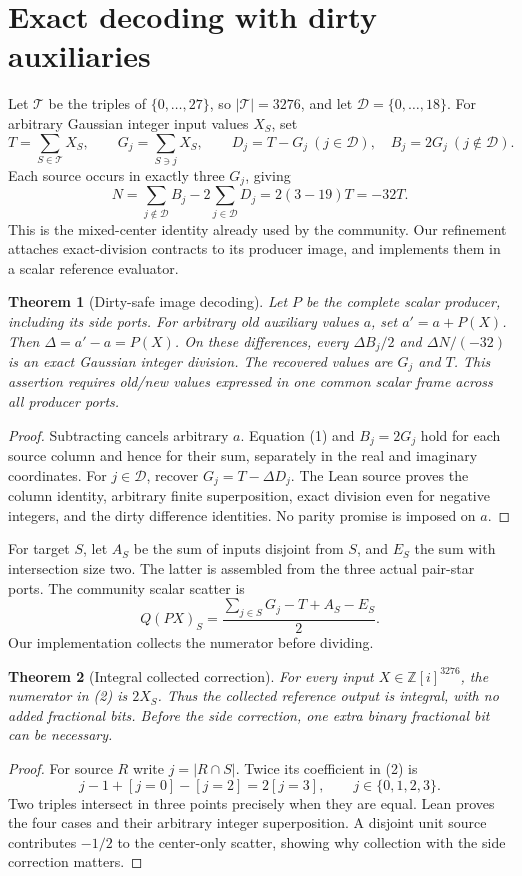 \documentclass[11pt,a4paper]{article}
\newtheorem{theorem}{Theorem}
\newcommand{\Gi}{\mathbb Z[i]}
\begin{document}
\section{Exact decoding with dirty auxiliaries}
Let $\mathcal T$ be the triples of $\{0,\ldots,27\}$, so
$|\mathcal T|=3276$, and let $\mathcal D=\{0,\ldots,18\}$.
For arbitrary Gaussian integer input values $X_S$, set
\[
 T=\sum_{S\in\mathcal T}X_S,\qquad
 G_j=\sum_{S\ni j}X_S,\qquad
 D_j=T-G_j\ (j\in\mathcal D),\quad
 B_j=2G_j\ (j\notin\mathcal D).
\]
Each source occurs in exactly three $G_j$, giving
\[
 N=\sum_{j\notin\mathcal D}B_j-2\sum_{j\in\mathcal D}D_j
   =2(3-19)T=-32T.\tag{1}
\]
This is the mixed-center identity already used by the community. Our
refinement attaches exact-division contracts to its producer image, and
implements them in a scalar reference evaluator.

\begin{theorem}[Dirty-safe image decoding]
Let $P$ be the complete scalar producer, including its side ports.
For arbitrary old auxiliary values $a$, set $a'=a+P(X)$.
Then $\Delta=a'-a=P(X)$. On these differences, every
$\Delta B_j/2$ and $\Delta N/(-32)$ is an exact Gaussian integer division.
The recovered values are $G_j$ and $T$. This assertion requires old/new
values expressed in one common scalar frame across all producer ports.
\end{theorem}
\begin{proof}
Subtracting cancels arbitrary $a$. Equation (1) and $B_j=2G_j$ hold for
each source column and hence for their sum, separately in the real and
imaginary coordinates. For $j\in\mathcal D$, recover
$G_j=T-\Delta D_j$. The Lean source proves the column identity, arbitrary
finite superposition, exact division even for negative integers, and the
dirty difference identities. No parity promise is imposed on $a$.
\end{proof}

For target $S$, let $A_S$ be the sum of inputs disjoint from $S$, and
$E_S$ the sum with intersection size two. The latter is assembled from
the three actual pair-star ports. The community scalar scatter is
\[
 Q(PX)_S=\frac{\sum_{j\in S}G_j-T+A_S-E_S}{2}.\tag{2}
\]
Our implementation collects the numerator before dividing.
\begin{theorem}[Integral collected correction]
For every input $X\in\Gi^{3276}$, the numerator in (2) is $2X_S$.
Thus the collected reference output is integral, with no added fractional
bits. Before the side correction, one extra binary fractional bit can be
necessary.
\end{theorem}
\begin{proof}
For source $R$ write $j=|R\cap S|$. Twice its coefficient in (2) is
\[
 j-1+[j=0]-[j=2]=2[j=3],\qquad j\in\{0,1,2,3\}.
\]
Two triples intersect in three points precisely when they are equal.
Lean proves the four cases and their arbitrary integer superposition.
A disjoint unit source contributes $-1/2$ to the center-only scatter,
showing why collection with the side correction matters.
\end{proof}
\end{document}
